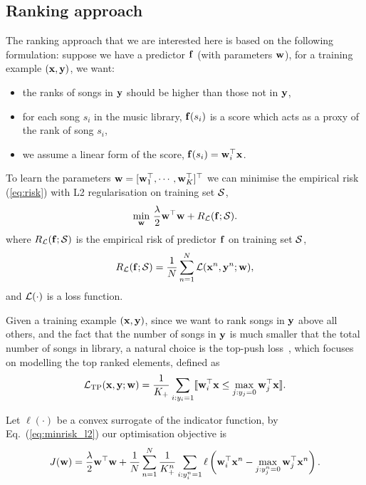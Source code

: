 \subsection{Ranking approach}
\label{ssec:rank}

The ranking approach that we are interested here is based on the following formulation:
suppose we have a predictor $\mathbf{f}$ (with parameters $\mathbf{w}$), for a training example $(\mathbf{x}, \mathbf{y})$, we want:
\begin{itemize}
\item the ranks of songs in $\mathbf{y}$ should be higher than those not in $\mathbf{y}$,
\item for each song $s_i$ in the music library, $\mathbf{f}(s_i)$ is a score which acts as a proxy of the rank of song $s_i$,
\item we assume a linear form of the score, \ie $\mathbf{f}(s_i) = \mathbf{w}_i^\top \mathbf{x}$.
\end{itemize}

To learn the parameters $\mathbf{w}  = [\mathbf{w}_1^\top, \cdots, \mathbf{w}_K^\top]^\top$ 
we can minimise the empirical risk (\ref{eq:risk}) with L2 regularisation on training set $\mathcal{S}$,
\begin{equation}
\label{eq:minrisk_l2}
\min_{\mathbf{w}} \, \frac{\lambda}{2} \mathbf{w}^\top \mathbf{w} + R_{\mathcal{L}}(\mathbf{f}; \mathcal{S}).
\end{equation}
where $R_{\mathcal{L}}(\mathbf{f}; \mathcal{S})$ is the empirical risk of predictor $\mathbf{f}$ on training set $\mathcal{S}$,
\begin{equation}
\label{eq:risk}
R_{\mathcal{L}}(\mathbf{f}; \mathcal{S}) = \frac{1}{N} \sum_{n=1}^N \mathcal{L} (\mathbf{x}^n, \mathbf{y}^n; \mathbf{w}),
\end{equation}
and $\mathcal{L}(\cdot)$ is a loss function. 

Given a training example $(\mathbf{x}, \mathbf{y})$, since we want to rank songs in $\mathbf{y}$ above all others, 
and the fact that the number of songs in $\mathbf{y}$ is much smaller that the total number of songs in library,
a natural choice is the top-push loss~\cite{li2014top}, which focuses on modelling the top ranked elements, defined as
\begin{equation}
\label{eq:tpush_loss}
\mathcal{L}_\text{TP}(\mathbf{x}, \mathbf{y}; \mathbf{w}) = \frac{1}{K_+} \sum_{i:y_i=1} \llbracket \mathbf{w}_i^\top \mathbf{x} \le \underset{j:y_j=0}{\max} \, \mathbf{w}_j^\top \mathbf{x} \rrbracket.
\end{equation}

Let $\ell(\cdot)$ be a convex surrogate of the indicator function, by Eq.~(\ref{eq:minrisk_l2}) our optimisation objective is
\begin{equation}
\label{eq:tpush_obj}
J(\mathbf{w}) = \frac{\lambda}{2} \mathbf{w}^\top \mathbf{w} + \frac{1}{N} \sum_{n=1}^N 
        \frac{1}{K_+^n} \sum_{i:y_i^n=1} \ell \left( \mathbf{w}_i^\top \mathbf{x}^n - \underset{j:y_j^n=0}{\max} \, \mathbf{w}_j^\top \mathbf{x}^n \right).
\end{equation}


